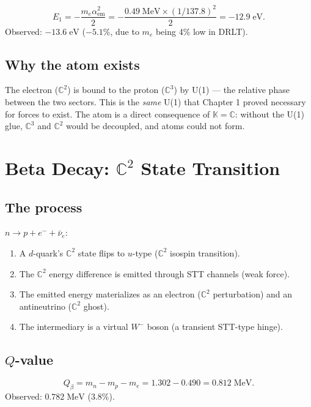 \documentclass[12pt]{article}
\theoremstyle{remark}
\begin{document}
\begin{equation}
E_1 = -\frac{m_e \alpha_\text{em}^2}{2} = -\frac{0.49\;\text{MeV} \times (1/137.8)^2}{2} = -12.9\;\text{eV}.
\end{equation}
Observed: $-13.6\;\text{eV}$ ($-5.1\%$, due to $m_e$ being 4\% low in DRLT).

\subsection{Why the atom exists}

The electron ($\mathbb{C}^2$) is bound to the proton ($\mathbb{C}^3$) by U(1) --- the relative phase between the two sectors. This is the \emph{same} U(1) that Chapter 1 proved necessary for forces to exist. The atom is a direct consequence of $\mathbb{K} = \mathbb{C}$: without the U(1) glue, $\mathbb{C}^3$ and $\mathbb{C}^2$ would be decoupled, and atoms could not form.

\section{Beta Decay: $\mathbb{C}^2$ State Transition}

\subsection{The process}

$n \to p + e^- + \bar{\nu}_e$:
\begin{enumerate}
\item A $d$-quark's $\mathbb{C}^2$ state flips to $u$-type ($\mathbb{C}^2$ isospin transition).
\item The $\mathbb{C}^2$ energy difference is emitted through STT channels (weak force).
\item The emitted energy materializes as an electron ($\mathbb{C}^2$ perturbation) and an antineutrino ($\mathbb{C}^2$ ghost).
\item The intermediary is a virtual $W^-$ boson (a transient STT-type hinge).
\end{enumerate}

\subsection{$Q$-value}

\begin{equation}
Q_\beta = m_n - m_p - m_e = 1.302 - 0.490 = 0.812\;\text{MeV}.
\end{equation}
Observed: $0.782\;\text{MeV}$ (3.8\%).
\end{document}
